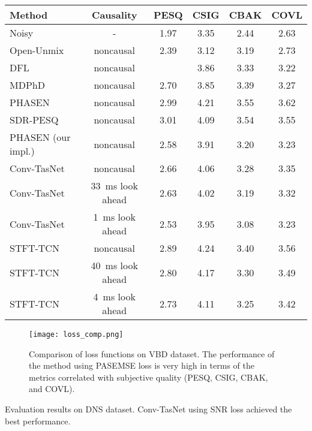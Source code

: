 \documentclass[a4paper]{article}
\begin{document}
\begin{spacing}{0.915}
\begin{table}[tb]
\begin{center}
{    \centering
   \begin{tabular}{l|c|cccc}
    \toprule
        Method & Causality & PESQ & CSIG & CBAK & COVL \\ 
        \midrule
        Noisy & - & 1.97  & 3.35  & 2.44  & 2.63  \\ 
        \midrule
               Open-Unmix~\cite{stoter2019open,uhlich_stefan_2020_3786908} & noncausal & 2.39 & 3.12 & 3.19 & 2.73  \\ 
        DFL~\cite{germain2018speech} & noncausal &  & 3.86  & 3.33  & 3.22  \\ 
        MDPhD~\cite{kim2018multi} & noncausal & 2.70  & 3.85  & 3.39  & 3.27  \\ 
        PHASEN~\cite{yin2019phasen} & noncausal & 2.99  & 4.21  & 3.55  & 3.62  \\ 
        SDR-PESQ~\cite{kim2019end} & noncausal & 3.01  & 4.09  & 3.54  & 3.55  \\ 
        \midrule
        PHASEN (our impl.) & noncausal & 2.58  & 3.91  & 3.20  & 3.23  \\ 
        Conv-TasNet & noncausal & 2.66 & 4.06 & 3.28 & 3.35   \\ 
        Conv-TasNet & 33~ms look ahead & 2.63 & 4.02 & 3.19 & 3.32  \\ 
        Conv-TasNet & 1~ms look ahead  & 2.53 & 3.95 & 3.08 & 3.23  \\ 
        STFT-TCN & noncausal & 2.89 & 4.24 & 3.40 & 3.56  \\ 
        STFT-TCN & 40~ms look ahead & 2.80 & 4.17 & 3.30 & 3.49  \\ 
        STFT-TCN & 4~ms look ahead & 2.73 & 4.11 & 3.25 & 3.42  \\ 
        \bottomrule
    \end{tabular}
}
\end{center}
\end{table}

\begin{figure*}[t]
  \centering
  \texttt{[image: loss\_comp.png]}
  \caption{Comparison of loss functions on VBD dataset. The performance of the method using PASEMSE loss is very high in terms of the metrics correlated with subjective quality (PESQ, CSIG, CBAK, and COVL).}
\label{fig:loss_comp}
\end{figure*}


\begin{table*}[htb]
\begin{center}
    \caption{Evaluation results on DNS dataset. Conv-TasNet using SNR loss achieved the best performance.}
      \label{tab:dns_comp}
\scalebox{0.58}{

}
\end{center}
\end{table*}
\end{spacing}
\end{document}
